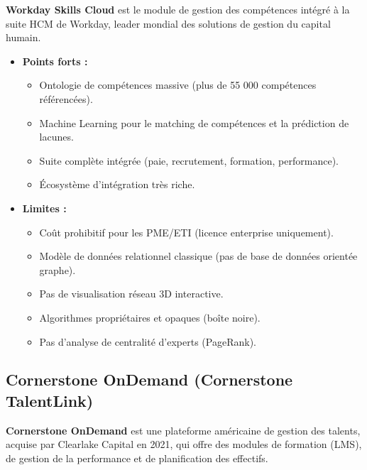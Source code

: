 \documentclass[12pt,a4paper]{article}
\begin{document}
\textbf{Workday Skills Cloud} est le module de gestion des compétences intégré à la suite HCM de Workday, leader mondial des solutions de gestion du capital humain.

\begin{itemize}[leftmargin=*]
    \item \textbf{Points forts :}
    \begin{itemize}[leftmargin=*, label=--]
        \item Ontologie de compétences massive (plus de 55 000 compétences référencées).
        \item Machine Learning pour le matching de compétences et la prédiction de lacunes.
        \item Suite complète intégrée (paie, recrutement, formation, performance).
        \item Écosystème d'intégration très riche.
    \end{itemize}
    \item \textbf{Limites :}
    \begin{itemize}[leftmargin=*, label=--]
        \item Coût prohibitif pour les PME/ETI (licence enterprise uniquement).
        \item Modèle de données relationnel classique (pas de base de données orientée graphe).
        \item Pas de visualisation réseau 3D interactive.
        \item Algorithmes propriétaires et opaques (boîte noire).
        \item Pas d'analyse de centralité d'experts (PageRank).
    \end{itemize}
\end{itemize}

\subsection{Cornerstone OnDemand (Cornerstone TalentLink)}

\textbf{Cornerstone OnDemand} est une plateforme américaine de gestion des talents, acquise par Clearlake Capital en 2021, qui offre des modules de formation (LMS), de gestion de la performance et de planification des effectifs.
\end{document}
